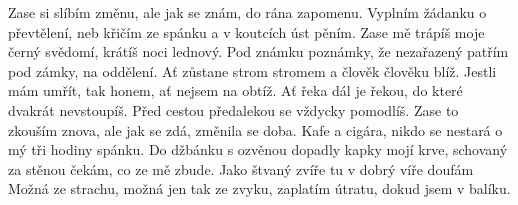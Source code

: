\ve{}
Zase si slíbím změnu,
ale jak se znám,
do rána zapomenu.
Vyplním žádanku o převtělení,
neb křičím ze spánku
a v koutcích úst pěním.
\ve{}
Zase mě trápíš
moje černý svědomí,
krátíš noci lednový.
Pod známku poznámky,
že nezařazený
patřím pod zámky, na oddělení.
\cho{}
Ať zůstane strom stromem
a člověk člověku blíž.
Jestli mám umřít,
tak honem,
ať nejsem na obtíž.
Ať řeka dál je řekou,
do které dvakrát nevstoupíš.
Před cestou předalekou
se vždycky pomodlíš.
\ve{}
Zase to zkouším znova,
ale jak se zdá,
změnila se doba.
Kafe a cigára,
nikdo se nestará
o mý tři hodiny spánku.
\ve{}
Do džbánku s ozvěnou
dopadly kapky mojí krve,
schovaný za stěnou čekám,
co ze mě zbude.
Jako štvaný zvíře
tu v dobrý víře
doufám
\cho{}
Možná ze strachu,
možná jen tak ze zvyku,
zaplatím útratu,
dokud jsem v balíku.
\esong{}